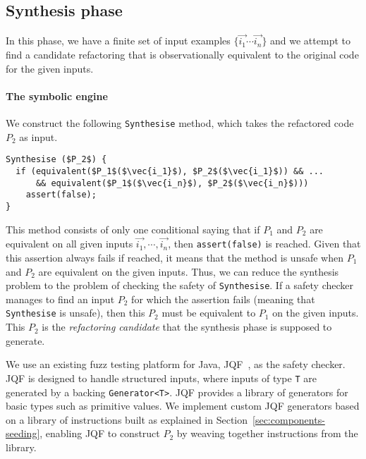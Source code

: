 \documentclass[sigconf,review,anonymous]{acmart}
\begin{document}

\subsection{Synthesis phase}\label{sec:synthesis}
In this phase, we have 
a finite set of input examples $\{\vec{i_1} \cdots \vec{i_n}\}$ and we attempt to find a candidate refactoring
that is observationally equivalent to the original code for the given inputs.

\paragraph{The symbolic engine}
We construct the following \texttt{Synthesise} method, which
takes the refactored code $P_2$ as input.

\begin{lstlisting}[mathescape=true,showstringspaces=false]
Synthesise ($P_2$) {
  if (equivalent($P_1$($\vec{i_1}$), $P_2$($\vec{i_1}$)) && ...
      && equivalent($P_1$($\vec{i_n}$), $P_2$($\vec{i_n}$)))
    assert(false);
}
\end{lstlisting}

This method consists of only one conditional saying that if $P_1$ and $P_2$ are equivalent on all given inputs $\vec{i_1}, \cdots, \vec{i_n}$, then \texttt{assert(false)} is reached.
Given that this assertion always fails if reached, it means that the method is unsafe when $P_1$ and $P_2$ are equivalent on the given inputs.
Thus, we can reduce the synthesis problem to the problem of checking the safety of \texttt{Synthesise}. If a safety checker manages to
find an input $P_2$ for which the assertion fails (meaning that \texttt{Synthesise} is unsafe), then this $P_2$ must be equivalent to $P_1$ on the given inputs. This $P_2$ is the {\em refactoring candidate}
that the synthesis phase is supposed to generate.

We use an existing fuzz testing platform for Java, JQF~\cite{DBLP:conf/issta/PadhyeLS19},
as the safety checker. JQF is designed to handle structured inputs, where inputs of type \texttt{T}
are generated by a backing \texttt{Generator<T>}. JQF provides a library of
generators for basic types such as primitive values. We implement custom
JQF generators based on a library of instructions built as explained in Section~\ref{sec:components-seeding},
enabling JQF to construct $P_2$ by weaving together instructions from the library.
\end{document}
